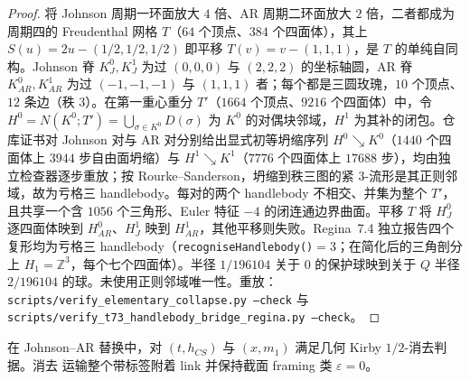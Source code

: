 \begin{proof}
将 Johnson 周期一环面放大 $4$ 倍、AR 周期二环面放大 $2$ 倍，二者都成为周期四的 Freudenthal 网格 $T$（$64$ 个顶点、$384$ 个四面体），其上 $S(u)=2u-(1/2,1/2,1/2)$ 即平移 $T(v)=v-(1,1,1)$，是 $T$ 的单纯自同构。Johnson 脊 $K_J^0,K_J^1$ 为过 $(0,0,0)$ 与 $(2,2,2)$ 的坐标轴圆，AR 脊 $K_{AR}^0,K_{AR}^1$ 为过 $(-1,-1,-1)$ 与 $(1,1,1)$ 者；每个都是三圆玫瑰，$10$ 个顶点、$12$ 条边（秩 $3$）。在第一重心重分 $T'$（$1664$ 个顶点、$9216$ 个四面体）中，令 $H^0=N(K^0;T')=\bigcup_{\sigma\in K^0}D(\sigma)$ 为 $K^0$ 的对偶块邻域，$H^1$ 为其补的闭包。仓库证书对 Johnson 对与 AR 对分别给出显式初等坍缩序列 $H^0\searrow K^0$（$1440$ 个四面体上 $3944$ 步自由面坍缩）与 $H^1\searrow K^1$（$7776$ 个四面体上 $17688$ 步），均由独立检查器逐步重放；按 Rourke--Sanderson，坍缩到秩三图的紧 $3$-流形是其正则邻域，故为亏格三 handlebody。每对的两个 handlebody 不相交、并集为整个 $T'$，且共享一个含 $1056$ 个三角形、Euler 特征 $-4$ 的闭连通边界曲面。平移 $T$ 将 $H_J^0$ 逐四面体映到 $H_{AR}^0$、$H_J^1$ 映到 $H_{AR}^1$，其他平移则失败。Regina~7.4 独立报告四个复形均为亏格三 handlebody（\texttt{recogniseHandlebody()}$=3$；在简化后的三角剖分上 $H_1=\mathbb Z^3$，每个七个四面体）。半径 $1/196104$ 关于 $0$ 的保护球映到关于 $Q$ 半径 $2/196104$ 的球。未使用正则邻域唯一性。重放：\texttt{scripts/verify\_elementary\_collapse.py --check} 与 \texttt{scripts/verify\_t73\_handlebody\_bridge\_regina.py --check}。
\end{proof}

\begin{lemma}\label{lem:P0b}
在 Johnson--AR 替换中，对 \((t,h_{CS})\) 与 \((x,m_1)\)
满足几何 Kirby \(1/2\)-消去判据。消去
运输整个带标签附着 link 并保持截面 framing 类 \(\varepsilon=0\)。
\end{lemma}

